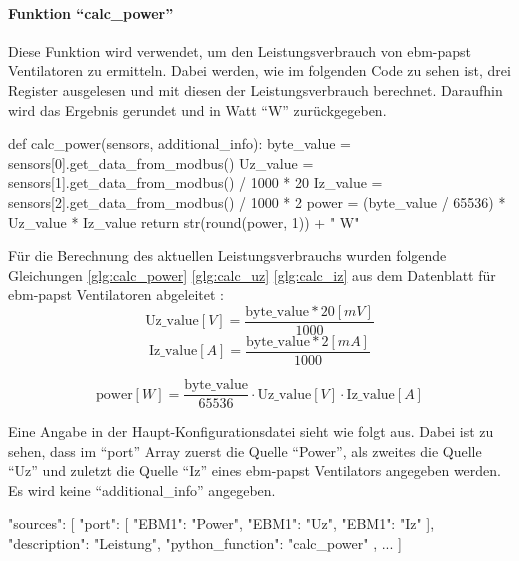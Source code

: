 \paragraph{Funktion \enquote{calc\_power}}
Diese Funktion wird verwendet, um den Leistungsverbrauch von ebm-papst Ventilatoren zu ermitteln. Dabei werden, wie im folgenden Code zu sehen ist, drei Register ausgelesen und mit diesen der Leistungsverbrauch berechnet. Daraufhin wird das Ergebnis gerundet und in Watt \enquote{W} zurückgegeben.

\begin{pythoncode}
def calc_power(sensors, additional_info):
	byte_value = sensors[0].get_data_from_modbus()
	Uz_value = sensors[1].get_data_from_modbus() / 1000 * 20
	Iz_value = sensors[2].get_data_from_modbus() / 1000 * 2
	power = (byte_value / 65536) * Uz_value * Iz_value
	return str(round(power, 1)) + " W"
\end{pythoncode}

Für die Berechnung des aktuellen Leistungsverbrauchs wurden folgende Gleichungen \eqref{glg:calc_power} \eqref{glg:calc_uz} \eqref{glg:calc_iz} aus dem Datenblatt für ebm-papst Ventilatoren abgeleitet \cite[vgl.][95,126]{ebmpapst:2020}: 
\begin{equation}
	\text{Uz\_value} \left[V\right] = \frac{\text{byte\_value} * 20 \left[mV\right]}{1000}
	\label{glg:calc_uz}
\end{equation} 
\begin{equation}
	\text{Iz\_value} \left[A\right] = \frac{\text{byte\_value} * 2 \left[mA\right]}{1000}
	\label{glg:calc_iz}
\end{equation} 

\begin{equation}
	\text{power} \left[W\right] = \frac{\text{byte\_value}}{65536} \cdot \text{Uz\_value}  \left[V\right] \cdot \text{Iz\_value} \left[A\right]
	\label{glg:calc_power}
\end{equation} 

Eine Angabe in der Haupt-Konfigurationsdatei sieht wie folgt aus. Dabei ist zu sehen, dass im \enquote{port} Array zuerst die Quelle \enquote{Power}, als zweites die Quelle \enquote{Uz} und zuletzt die Quelle \enquote{Iz} eines ebm-papst Ventilators angegeben werden. Es wird keine \enquote{additional\_info} angegeben.

\begin{jsoncode}
"sources": [
	{
		"port": [
			{"EBM1": "Power"},
			{"EBM1": "Uz"},
			{"EBM1": "Iz"}
		],
		"description": "Leistung",
		"python_function": "calc_power"
	},
	...
]
\end{jsoncode}



